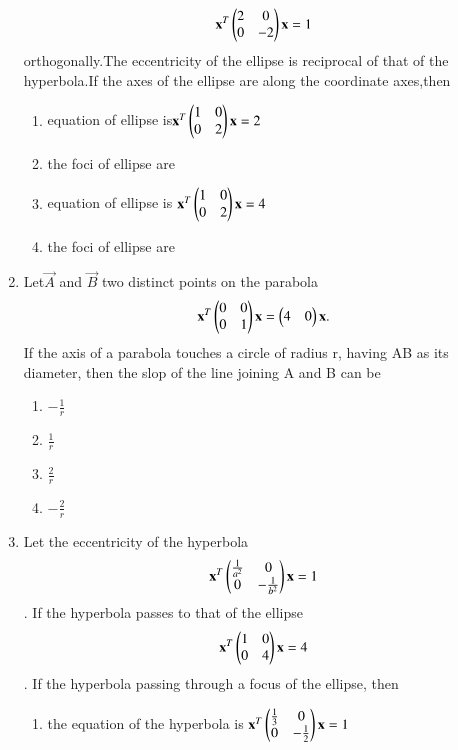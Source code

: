 \documentclass[journal,12pt,twocolumn]{IEEEtran}
\begin{document}
\begin{enumerate}[label=\arabic*]
    \begin{align}
    \mathbf{x}^T \begin{pmatrix}2& 0 \\0 & -2\end{pmatrix}\mathbf{x}=1
    \end{align} orthogonally.The eccentricity of the ellipse is reciprocal of that of the hyperbola.If the axes of the ellipse are along the coordinate axes,then
    \begin{enumerate}
    \item equation of ellipse is$\mathbf{x}^T\begin{pmatrix}1& 0 \\0 & 2\end{pmatrix}\mathbf{x}=2$
    \item the foci of ellipse are 
    \item equation of ellipse is $\mathbf{x}^T \begin{pmatrix}1& 0 \\0 & 2\end{pmatrix}\mathbf{x}=4$
    \item the foci of ellipse are 
    \end{enumerate}
    \item Let$\vec{A}$ and $\vec{B}$ two distinct points on the parabola 
    \begin{align}
    \mathbf{x}^T \begin{pmatrix}0& 0 \\0 & 1\end{pmatrix} \mathbf{x}=\begin{pmatrix}4&0\end{pmatrix}\mathbf{x}.
    \end{align} If the axis of a parabola touches a circle of radius r, 
    having AB as its diameter, then the slop of the line joining A and B can be 
    \begin{enumerate}
    \item $-\frac{1}{r}$
    \item $\frac{1}{r}$
    \item $\frac{2}{r}$
    \item $-\frac{2}{r}$
    \end{enumerate}
    \item Let the eccentricity of the hyperbola
    \begin{align}
    \mathbf{x}^T \begin{pmatrix}\frac{1}{a^2}& 0 \\0 & -\frac{1}{b^2}\end{pmatrix} \mathbf{x}=1
    \end{align}. If the hyperbola passes to that of the ellipse
    \begin{align}
    \mathbf{x}^T \begin{pmatrix}1& 0 \\0 & 4 \end{pmatrix}\mathbf{x}=4
    \end{align}. If the hyperbola passing through a focus of the ellipse, then
    \begin{enumerate}
    \item the equation of the hyperbola is $\mathbf{x}^T \begin{pmatrix}\frac{1}{3}& 0 \\0 & -\frac{1}{2}\end{pmatrix} \mathbf{x}=1$

\end{enumerate}
\end{enumerate}
\end{document}
